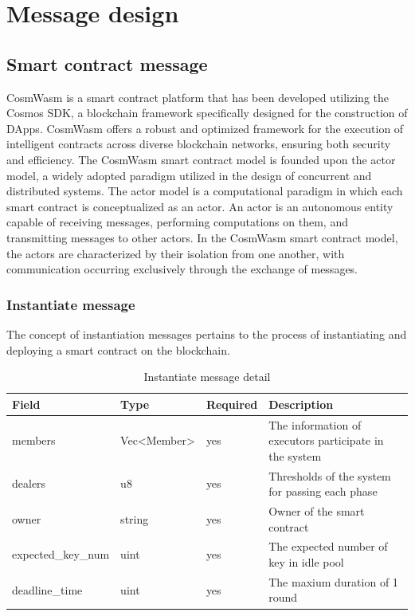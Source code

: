 \documentclass[../Main.tex]{subfiles}
\begin{document}
\section{Message design}
\subsection{Smart contract message}
CosmWasm \cite{cosmwasm} is a smart contract platform that has been developed utilizing the Cosmos SDK\cite{cosmos-sdk}, a blockchain framework specifically designed for the construction of DApps. CosmWasm offers a robust and optimized framework for the execution of intelligent contracts across diverse blockchain networks, ensuring both security and efficiency. The CosmWasm smart contract model is founded upon the actor model, a widely adopted paradigm utilized in the design of concurrent and distributed systems. The actor model is a computational paradigm in which each smart contract is conceptualized as an actor. An actor is an autonomous entity capable of receiving messages, performing computations on them, and transmitting messages to other actors. In the CosmWasm smart contract model, the actors are characterized by their isolation from one another, with communication occurring exclusively through the exchange of messages.
\subsubsection{Instantiate message}
The concept of instantiation messages pertains to the process of instantiating and deploying a smart contract on the blockchain.
\begin{table}[H]
  \centering
  \begin{tabular}{|l|l|l|p{8cm}|}
\hline
\rowcolor[HTML]{F56B00} 
\textbf{Field}                  & \textbf{Type}                      & \textbf{Required} & \textbf{Description}                                   \\ \hline
\cellcolor[HTML]{FFFFFF}members  & Vec\textless{}Member\textgreater{} & yes               & The information of executors participate in the system \\ \hline
\cellcolor[HTML]{FFFFFF}dealers & u8                                 & yes               & Thresholds of the system for passing each phase        \\ \hline
owner                           & string                             & yes               & Owner of the smart contract                            \\ \hline
expected\_key\_num              & uint                               & yes               & The expected number of key in idle pool                \\ \hline
deadline\_time                  & uint                               & yes               & The maxium duration of 1 round                         \\ \hline
\end{tabular}
  \caption{Instantiate message detail}
  \label{instantiate-message-detail}
\end{table}
\end{document}
